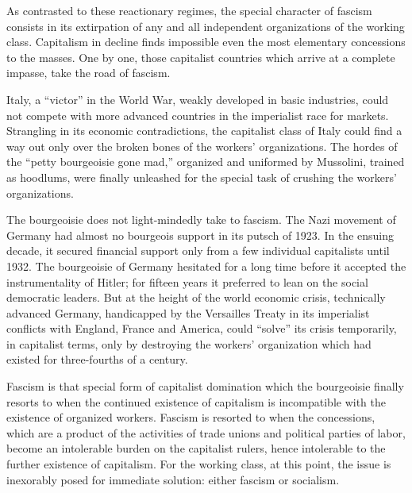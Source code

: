 As contrasted to these reactionary regimes, the special character of fascism consists in its extirpation of any and all independent organizations of the working class. Capitalism in decline finds impossible even the most elementary concessions to the masses. One by one, those capitalist countries which arrive at a complete impasse, take the road of fascism.

Italy, a ``victor'' in the World War, weakly developed in basic industries, could not compete with more advanced countries in the imperialist race for markets. Strangling in its economic contradictions, the capitalist class of Italy could find a way out only over the broken bones of the workers’ organizations. The hordes of the ``petty bourgeoisie gone mad,'' organized and uniformed by Mussolini,{\indexBMussolini} trained as hoodlums, were finally unleashed for the special task of crushing the workers’ organizations.

The bourgeoisie does not light-mindedly take to fascism. The Nazi movement of Germany had almost no bourgeois support in its putsch of 1923. In the ensuing decade, it secured financial support only from a few individual capitalists until 1932. The bourgeoisie of Germany hesitated for a long time before it accepted the instrumentality of Hitler{\indexAHitler}; for fifteen years it preferred to lean on the social democratic leaders. But at the height of the world economic crisis, technically advanced Germany, handicapped by the Versailles Treaty in its imperialist conflicts with England, France and America, could ``solve'' its crisis temporarily, in capitalist terms, only by destroying the workers’ organization which had existed for three-fourths of a century.

Fascism is that special form of capitalist domination which the bourgeoisie finally resorts to when the continued existence of capitalism is incompatible with the existence of organized workers. Fasc\-ism is resorted to when the concessions, which are a product of the activities of trade unions and political parties of labor, become an intolerable burden on the capitalist rulers, hence intolerable to the further existence of capitalism. For the working class, at this point, the issue is inexorably posed for immediate solution: either fascism or socialism.


